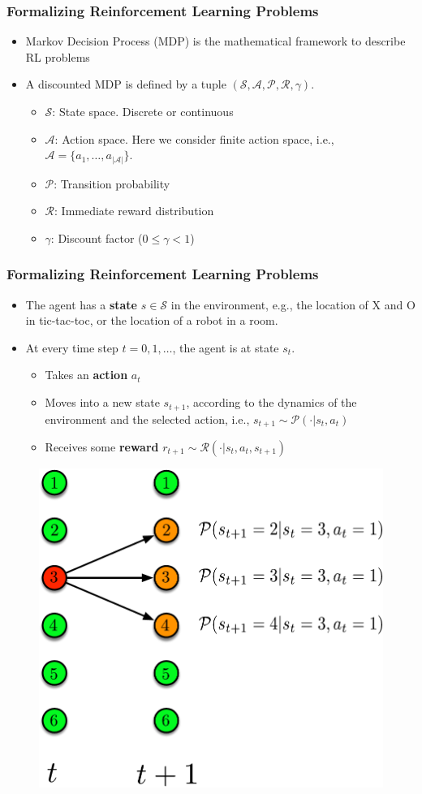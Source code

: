 \documentclass{beamer}
\newcommand{\States}{\mathcal{S}}
\newcommand{\Actions}{\mathcal{A}}
\newcommand{\PKernel}{\mathcal{P}}
\newcommand{\RKernel}{\mathcal{R}}
\renewcommand{\high}{\textbf}
\begin{document}
\begin{frame}\frametitle{Formalizing Reinforcement Learning Problems}\small
\begin{itemize}
\item Markov Decision Process (MDP) is the mathematical framework to describe RL problems
\item A discounted MDP is defined by a tuple $(\States, \Actions, \PKernel, \RKernel, \gamma)$.
\begin{itemize}
	\item $\States$: State space. Discrete or continuous
	\item $\Actions$: Action space. Here we consider finite action space, i.e., $\Actions = \{a_1, \dotsc, a_{|\Actions|} \}$.
	\item $\PKernel$: Transition probability
	\item $\RKernel$: Immediate reward distribution
	\item $\gamma$: Discount factor ($0 \leq \gamma < 1$)
\end{itemize}
\end{itemize}

\end{frame}


\begin{frame}\frametitle{Formalizing Reinforcement Learning Problems}\small
\begin{itemize}
\item The agent has a \high{state} $s \in \mathcal{S}$ in the environment, e.g., the location of X and O in tic-tac-toc, or the location of a robot in a room.
\item At every time step $t = 0, 1, \dotsc$, the agent is at state $s_t$.
	\begin{itemize}
	\item Takes an \high{action} $a_t$
	\item Moves into a new state $s_{t+1}$, according to the dynamics of the environment and the selected action, i.e., $s_{t+1} \sim \PKernel(\cdot|s_t, a_t)$
	\item Receives some \high{reward} $r_{t+1} \sim \RKernel(\cdot|s_t, a_t, s_{t+1})$
	\end{itemize}
\end{itemize}
\begin{figure}
\includegraphics[width=0.3\linewidth]{Figures/MDP_transition}
\end{figure}
\end{frame}
\end{document}

